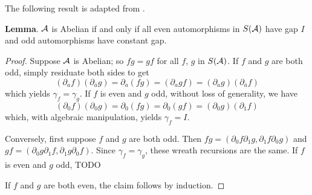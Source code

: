 \documentclass[11pt]{article}
\begin{document}
The following result is adapted from \cite{okano:thesis}.

\textbf{Lemma}. $\mathcal{A}$ is Abelian if and only if all even automorphisms
in $S(\mathcal{A})$ have gap $I$ and odd automorphisms have constant gap.

\begin{proof}
Suppose $\mathcal{A}$ is Abelian; so $fg = gf$ for all $f$, $g$ in $S(\mathcal{A})$.
If $f$ and $g$ are both odd, simply residuate both sides to get
\[
  (\partial_a f)(\partial_{\bar{a}}g) =
  \partial_a (fg) =
  (\partial_a gf) =
  (\partial_a g)(\partial_{\bar{a}}f)
\]
which yields $\gamma_f = \gamma_g$. If $f$ is even and $g$ odd, without loss of generality, we have
\[
  (\partial_0f)(\partial_0 g) = 
  \partial_0(fg) =
  \partial_0(gf) =
  (\partial_0g)(\partial_1 f)
\]
which, with algebraic manipulation, yields $\gamma_f = I$.

Conversely, first suppose $f$ and $g$ are both odd. Then
$fg = (\partial_0 f \partial_1 g, \partial_1 f \partial_0 g)$ and
$gf = (\partial_0 g \partial_1 f, \partial_1 g \partial_0 f)$. Since
$\gamma_f = \gamma_g$, these wreath recursions are the same. If $f$ is
even and $g$ odd, TODO

If $f$ and $g$ are both even, the claim follows by induction.
\end{proof}
\end{document}
